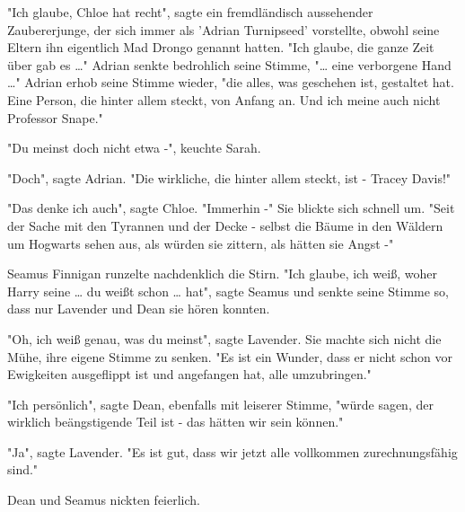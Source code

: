{"Ich glaube, Chloe hat recht", sagte ein fremdländisch aussehender Zaubererjunge, der sich immer als 'Adrian Turnipseed' vorstellte, obwohl seine Eltern ihn eigentlich Mad Drongo genannt hatten. "Ich glaube, die ganze Zeit über gab es …" Adrian senkte bedrohlich seine Stimme, "… eine verborgene Hand …" Adrian erhob seine Stimme wieder, "die alles, was geschehen ist, gestaltet hat. Eine Person, die hinter allem steckt, von Anfang an. Und ich meine auch nicht Professor Snape."

"Du meinst doch nicht etwa -", keuchte Sarah.

"Doch", sagte Adrian. "Die wirkliche, die hinter allem steckt, ist - Tracey Davis!"

"Das denke ich auch", sagte Chloe. "Immerhin -" Sie blickte sich schnell um. "Seit der Sache mit den Tyrannen und der Decke - selbst die Bäume in den Wäldern um Hogwarts sehen aus, als würden sie zittern, als hätten sie Angst -"

Seamus Finnigan runzelte nachdenklich die Stirn. "Ich glaube, ich weiß, woher Harry seine … du weißt schon … hat", sagte Seamus und senkte seine Stimme so, dass nur Lavender und Dean sie hören konnten.

"Oh, ich weiß genau, was du meinst", sagte Lavender. Sie machte sich nicht die Mühe, ihre eigene Stimme zu senken. "Es ist ein Wunder, dass er nicht schon vor Ewigkeiten ausgeflippt ist und angefangen hat, alle umzubringen."

"Ich persönlich", sagte Dean, ebenfalls mit leiserer Stimme, "würde sagen, der wirklich beängstigende Teil ist - das hätten wir sein können."

"Ja", sagte Lavender. "Es ist gut, dass wir jetzt alle vollkommen zurechnungsfähig sind."

Dean und Seamus nickten feierlich.

}
